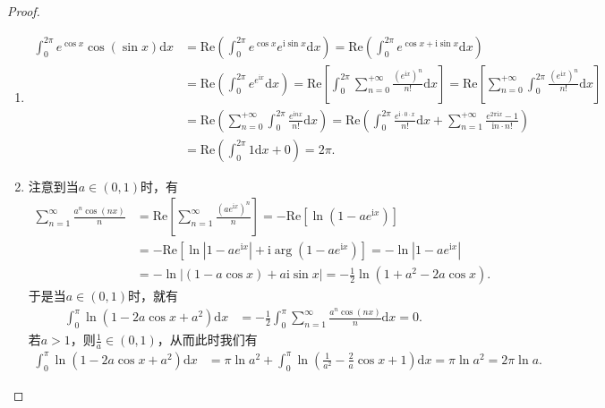 \documentclass[../../main.tex]{subfiles}%
\begin{document}
\begin{proof}
\begin{enumerate}
\item \begin{align*}
\int_0^{2\pi}{e^{\cos x}\cos \left( \sin x \right) \mathrm{d}x}&=\mathrm{Re}\left( \int_0^{2\pi}{e^{\cos x}e^{\mathrm{i}\sin x}\mathrm{d}x} \right) =\mathrm{Re}\left( \int_0^{2\pi}{e^{\cos x+\mathrm{i}\sin x}\mathrm{d}x} \right) 
\\
&=\mathrm{Re}\left( \int_0^{2\pi}{e^{e^{\mathrm{i}x}}\mathrm{d}x} \right) =\mathrm{Re}\left[ \int_0^{2\pi}{\sum_{n=0}^{+\infty}{\frac{\left( e^{\mathrm{i}x} \right) ^n}{n!}}\mathrm{d}x} \right] =\mathrm{Re}\left[ \sum_{n=0}^{+\infty}{\int_0^{2\pi}{\frac{\left( e^{\mathrm{i}x} \right) ^n}{n!}\mathrm{d}x}} \right] 
\\
&=\mathrm{Re}\left( \sum_{n=0}^{+\infty}{\int_0^{2\pi}{\frac{e^{\mathrm{i}nx}}{n!}\mathrm{d}x}} \right) =\mathrm{Re}\left( \int_0^{2\pi}{\frac{e^{\mathrm{i}\cdot 0\cdot x}}{n!}\mathrm{d}x}+\sum_{n=1}^{+\infty}{\frac{e^{2\pi \mathrm{i}x}-1}{\mathrm{i}n\cdot n!}} \right) 
\\
&=\mathrm{Re}\left( \int_0^{2\pi}{1\mathrm{d}x}+0 \right) =2\pi .
\end{align*}

\item 注意到当\(a\in(0,1)\)时，有
\begin{align*}
\sum_{n = 1}^{\infty} \frac{a^n\cos(nx)}{n} &= \mathrm{Re}\left[ \sum_{n = 1}^{\infty} \frac{(ae^{\mathrm{i}x})^n}{n} \right] = -\mathrm{Re}\left[ \ln(1 - ae^{\mathrm{i}x}) \right] \\
&= -\mathrm{Re}\left[ \ln|1 - ae^{\mathrm{i}x}| + \mathrm{i} \arg(1 - ae^{\mathrm{i}x}) \right] = -\ln|1 - ae^{\mathrm{i}x}| \\
&= -\ln|(1 - a\cos x) + a\mathrm{i}\sin x| = -\frac{1}{2}\ln(1 + a^2 - 2a\cos x).
\end{align*}
于是当\(a\in(0,1)\)时，就有
\begin{align*}
\int_0^{\pi} \ln(1 - 2a\cos x + a^2) \mathrm{d}x &= -\frac{1}{2}\int_0^{\pi} \sum_{n = 1}^{\infty} \frac{a^n\cos(nx)}{n} \mathrm{d}x = 0.
\end{align*}
若\(a > 1\)，则\(\frac{1}{a}\in(0,1)\)，从而此时我们有
\begin{align*}
\int_0^{\pi} \ln(1 - 2a\cos x + a^2) \mathrm{d}x &= \pi \ln a^2 + \int_0^{\pi} \ln\left( \frac{1}{a^2} - \frac{2}{a}\cos x + 1 \right) \mathrm{d}x = \pi \ln a^2 = 2\pi \ln a.
\end{align*}


\end{enumerate}
\end{proof}
\end{document}
